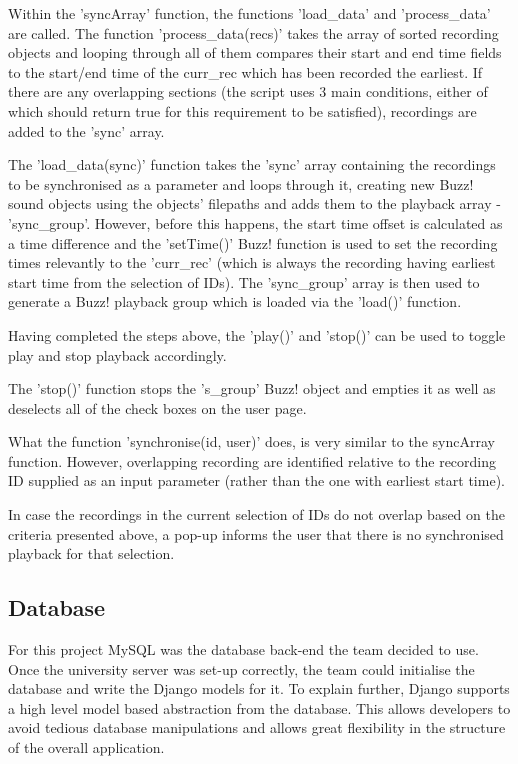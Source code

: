 \documentclass{l3proj}
\begin{document}
Within the 'syncArray' function, the functions 'load\_data' and 'process\_data' are called. The function 'process_data(recs)' takes the array of sorted recording objects and looping through all of them compares their start and end time fields to the start/end time of the curr_rec which has been recorded the earliest. If there are any overlapping sections (the script uses 3 main conditions, either of which should return true for this requirement to be satisfied), recordings are added to the 'sync' array.

The 'load\_data(sync)' function takes the 'sync' array containing the recordings to be synchronised as a parameter and loops through it, creating new Buzz! sound objects using the objects' filepaths and adds them to the playback array - 'sync\_group'. However, before this happens, the start time offset is calculated as a time difference and the 'setTime()' Buzz! function is used to set the recording times relevantly to the 'curr_rec' (which is always the recording having earliest start time from the selection of IDs). The 'sync\_group' array is then used to generate a Buzz! playback group which is loaded via the 'load()' function.

Having completed the steps above, the 'play()' and 'stop()' can be used to toggle play and stop playback accordingly.

The 'stop()' function stops the 's\_group' Buzz! object and empties it as well as deselects all of the check boxes on the user page.

What the function 'synchronise(id, user)' does, is very similar to the syncArray function. However, overlapping recording are identified relative to the recording ID supplied as an input parameter (rather than the one with earliest start time).

In case the recordings in the current selection of IDs do not overlap based on the criteria presented above, a pop-up informs the user that there is no synchronised playback for that selection.

\subsection{Database}
For this project \gls{MySQL} was the database back-end the team decided to use. Once the university server was set-up correctly, the team could initialise the database and write the Django models for it. To explain further, Django supports a high level model based abstraction from the database. This allows developers to avoid tedious database manipulations and allows great flexibility in the structure of the overall application.
\end{document}
